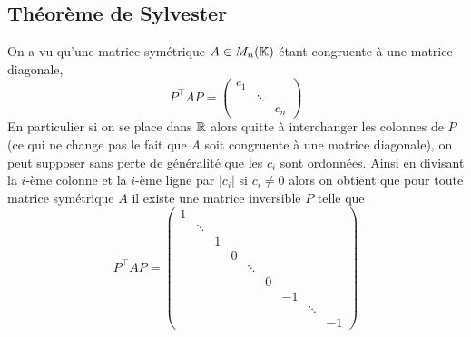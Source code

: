 \subsection{Théorème de Sylvester}
On a vu qu'une matrice symétrique $A \in M_n(\mathbb K)$ étant congruente à une matrice diagonale,
\[
P^\top A P = \begin{pmatrix}
	c_1 &   & \\
	    & \ddots & \\
	    &   &  c_n 
\end{pmatrix}
\]
En particulier si on se place dans $\mathbb R$ alors 
quitte à interchanger les colonnes de $P$ (ce qui ne change pas le fait que $A$ soit congruente à une matrice diagonale), on peut supposer sans perte de généralité que les $c_i$ sont ordonnées. Ainsi en divisant la $i$-ème colonne et la $i$-ème ligne par $|c_i|$ si $c_i \neq 0$ alors on obtient que pour toute matrice symétrique $A$ il existe une matrice inversible $P$ telle que
\[
P^\top A P = 
\begin{pmatrix}
	1 &   &   &   &   &   &   &   &   \\
	& \ddots &   &   &   &   &   &   &   \\
	&   & 1 &   &   &   &   &   &   \\
	&   &   & 0 &   &   &   &   &   \\
	&   &   &   & \ddots &   &   &   &   \\
	&   &   &   &   & 0 &   &   &   \\
	&   &   &   &   &   & -1 &   &   \\
	&   &   &   &   &   &   & \ddots &   \\
	&   &   &   &   &   &   &   & -1
\end{pmatrix}
\]


